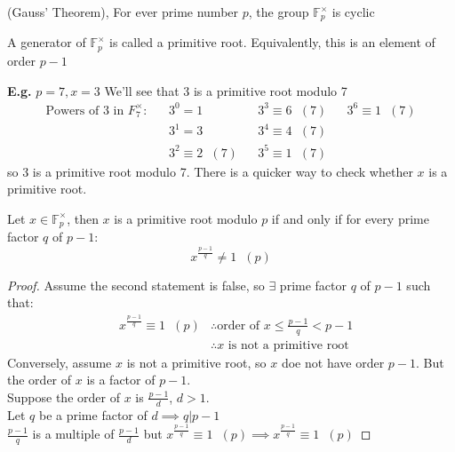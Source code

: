 \documentclass[11pt]{article}
\begin{document}
\begin{theorem}
	(Gauss' Theorem), For ever prime number $p$, the group $\mathbb{F}^{\times}_{p}$ is cyclic
\end{theorem}
\begin{definition}
	A generator of $\mathbb{F}^{\times}_p$ is called a primitive root. Equivalently, this is an element of order $p-1$
\end{definition}
\textbf{E.g.} $p=7, x=3$ We'll see that 3 is a primitive root modulo 7
\begin{align*}
	\text{Powers of 3 in }F^{\times}_7: && 3^0 =1 && 3^3 \equiv 6 \hspace{7pt}(7) && 3^6 \equiv 1\hspace{7pt} (7)\\
	&& 3^1= 3 && 3^4 \equiv 4 \hspace{7pt}(7) \\
	&& 3^2 \equiv 2\hspace{7pt} (7) &&3^5 \equiv 1 \hspace{7pt} (7)
\end{align*}
so 3 is a primitive root modulo 7.
There is a quicker way to check whether $x$ is a primitive root.

\begin{proposition}
	Let $x \in \mathbb{F}^{\times}_p$, then $x$ is a primitive root modulo $p$ if and only if for every prime factor $q$ of $p-1$:
	\begin{equation*}
		x^{\frac{p-1}{q}} \neq 1\hspace{7pt} (p)
	\end{equation*}
\end{proposition}

\begin{proof}
Assume the second statement is false, so $\exists$ prime factor $q$ of $p-1$ such that:
	\begin{align*}
		&x^{\frac{p-1}{q}} \equiv 1\hspace{7pt} (p) \hspace{0pt} &\therefore \text{order of } x \leq \frac{p-1}{q} < p-1\\
&& \therefore x \text{ is not a primitive root}
	\end{align*}
Conversely, assume $x$ is not a primitive root, so $x$ doe not have order $p-1$. But the order of $x$ is a factor of $p-1$.\\
Suppose the order of $x$ is $\frac{p-1}{d}$, $d>1$.\\

Let $q$ be a prime factor of $d  \implies q | p-1$ \\

	$\frac{p-1}{q}$ is a multiple of $\frac{p-1}{d}$ but $x^{\frac{p-1}{q}} \equiv 1\hspace{7pt} (p) \implies x^{\frac{p-1}{q}} \equiv 1 \hspace{7pt} (p)$

\end{proof}
\end{document}
